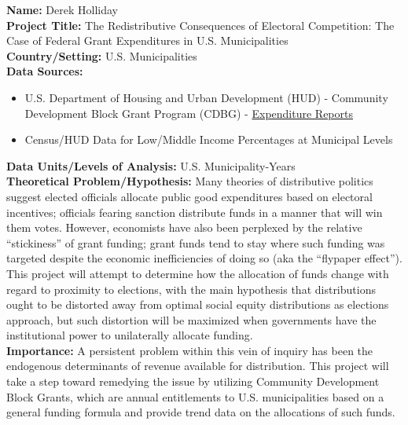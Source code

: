 \documentclass[12pt,a4paper]{article}
\begin{document}
{\setlength{\parindent}{0cm}
\textbf{Name:} Derek Holliday\\

\textbf{Project Title:} The Redistributive Consequences of Electoral Competition: The Case of Federal Grant Expenditures in U.S. Municipalities\\

\textbf{Country/Setting:} U.S. Municipalities\\

\textbf{Data Sources:}
\begin{itemize}
	\item U.S. Department of Housing and Urban Development (HUD) - Community Development Block Grant Program (CDBG) - \href{https://www.hudexchange.info/programs/cdbg/cdbg-expenditure-reports/}{Expenditure Reports}
	\item Census/HUD Data for Low/Middle Income Percentages at Municipal Levels
\end{itemize}

\textbf{Data Units/Levels of Analysis:} U.S. Municipality-Years\\

\textbf{Theoretical Problem/Hypothesis:} Many theories of distributive politics suggest elected officials allocate public good expenditures based on electoral incentives; officials fearing sanction distribute funds in a manner that will win them votes. However, economists have also been perplexed by the relative ``stickiness'' of grant funding; grant funds tend to stay where such funding was targeted despite the economic inefficiencies of doing so (aka the ``flypaper effect''). This project will attempt to determine how the allocation of funds change with regard to proximity to elections,  with the main hypothesis that distributions ought to be distorted away from optimal social equity distributions as elections approach, but such distortion will be maximized when governments have the institutional power to unilaterally allocate funding.\\

\textbf{Importance:} A persistent problem within this vein of inquiry has been the endogenous determinants of revenue available for distribution. This project will take a step toward remedying the issue by utilizing Community Development Block Grants, which are annual entitlements to U.S. municipalities based on a general funding formula and provide trend data on the allocations of such funds.\\ 
}
\end{document}
